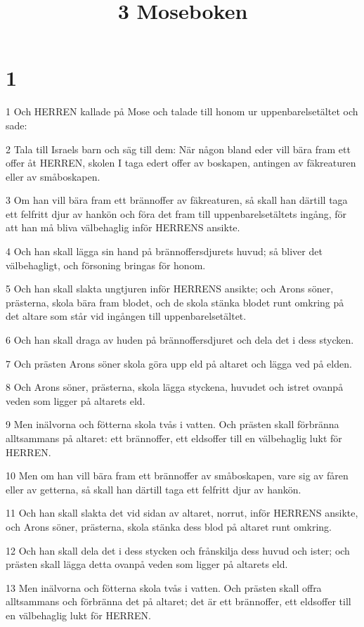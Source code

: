 

\title{3 Moseboken}


\chapter{1}

\par 1 Och HERREN kallade på Mose och talade till honom ur uppenbarelsetältet och sade:
\par 2 Tala till Israels barn och säg till dem: När någon bland eder vill bära fram ett offer åt HERREN, skolen I taga edert offer av boskapen, antingen av fäkreaturen eller av småboskapen.
\par 3 Om han vill bära fram ett brännoffer av fäkreaturen, så skall han därtill taga ett felfritt djur av hankön och föra det fram till uppenbarelsetältets ingång, för att han må bliva välbehaglig inför HERRENS ansikte.
\par 4 Och han skall lägga sin hand på brännoffersdjurets huvud; så bliver det välbehagligt, och försoning bringas för honom.
\par 5 Och han skall slakta ungtjuren inför HERRENS ansikte; och Arons söner, prästerna, skola bära fram blodet, och de skola stänka blodet runt omkring på det altare som står vid ingången till uppenbarelsetältet.
\par 6 Och han skall draga av huden på brännoffersdjuret och dela det i dess stycken.
\par 7 Och prästen Arons söner skola göra upp eld på altaret och lägga ved på elden.
\par 8 Och Arons söner, prästerna, skola lägga styckena, huvudet och istret ovanpå veden som ligger på altarets eld.
\par 9 Men inälvorna och fötterna skola tvås i vatten. Och prästen skall förbränna alltsammans på altaret: ett brännoffer, ett eldsoffer till en välbehaglig lukt för HERREN.
\par 10 Men om han vill bära fram ett brännoffer av småboskapen, vare sig av fåren eller av getterna, så skall han därtill taga ett felfritt djur av hankön.
\par 11 Och han skall slakta det vid sidan av altaret, norrut, inför HERRENS ansikte, och Arons söner, prästerna, skola stänka dess blod på altaret runt omkring.
\par 12 Och han skall dela det i dess stycken och frånskilja dess huvud och ister; och prästen skall lägga detta ovanpå veden som ligger på altarets eld.
\par 13 Men inälvorna och fötterna skola tvås i vatten. Och prästen skall offra alltsammans och förbränna det på altaret; det är ett brännoffer, ett eldsoffer till en välbehaglig lukt för HERREN.
